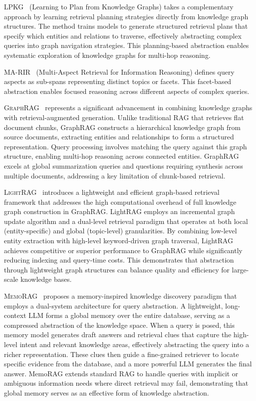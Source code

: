 \documentclass{article}
\begin{document}
\textsc{LPKG}~\citep{LPKG} (Learning to Plan from Knowledge Graphs) takes a complementary approach by learning retrieval planning strategies directly from knowledge graph structures. The method trains models to generate structured retrieval plans that specify which entities and relations to traverse, effectively abstracting complex queries into graph navigation strategies. This planning-based abstraction enables systematic exploration of knowledge graphs for multi-hop reasoning.

\textsc{MA-RIR}~\citep{MA-RIR} (Multi-Aspect Retrieval for Information Reasoning) defines query aspects as sub-spans representing distinct topics or facets. This facet-based abstraction enables focused reasoning across different aspects of complex queries.

\textsc{GraphRAG}~\citep{GraphRAG} represents a significant advancement in combining knowledge graphs with retrieval-augmented generation. Unlike traditional RAG that retrieves flat document chunks, GraphRAG constructs a hierarchical knowledge graph from source documents, extracting entities and relationships to form a structured representation. Query processing involves matching the query against this graph structure, enabling multi-hop reasoning across connected entities. GraphRAG excels at global summarization queries and questions requiring synthesis across multiple documents, addressing a key limitation of chunk-based retrieval.

\textsc{LightRAG}~\citep{LightRAG} introduces a lightweight and efficient graph-based retrieval framework that addresses the high computational overhead of full knowledge graph construction in GraphRAG. LightRAG employs an incremental graph update algorithm and a dual-level retrieval paradigm that operates at both local (entity-specific) and global (topic-level) granularities. By combining low-level entity extraction with high-level keyword-driven graph traversal, LightRAG achieves competitive or superior performance to GraphRAG while significantly reducing indexing and query-time costs. This demonstrates that abstraction through lightweight graph structures can balance quality and efficiency for large-scale knowledge bases.

\textsc{MemoRAG}~\citep{MemoRAG} proposes a memory-inspired knowledge discovery paradigm that employs a dual-system architecture for query abstraction. A lightweight, long-context LLM forms a global memory over the entire database, serving as a compressed abstraction of the knowledge space. When a query is posed, this memory model generates draft answers and retrieval clues that capture the high-level intent and relevant knowledge areas, effectively abstracting the query into a richer representation. These clues then guide a fine-grained retriever to locate specific evidence from the database, and a more powerful LLM generates the final answer. MemoRAG extends standard RAG to handle queries with implicit or ambiguous information needs where direct retrieval may fail, demonstrating that global memory serves as an effective form of knowledge abstraction.
\end{document}
